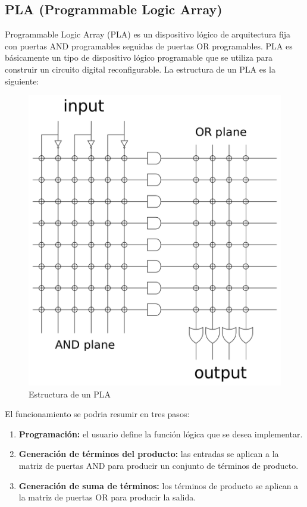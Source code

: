 \subsection{PLA (Programmable Logic Array)}
Programmable Logic Array (PLA) es un dispositivo lógico de arquitectura fija con puertas AND programables seguidas de puertas OR programables. PLA es básicamente un tipo de dispositivo lógico programable que se utiliza para construir un circuito digital reconfigurable. La estructura de un PLA es la siguiente:

\begin{figure}[h]
    \centering
    \includegraphics[scale=0.2]{img/pla.png}
    \caption{Estructura de un PLA}
\end{figure}

El funcionamiento se podria resumir en tres pasos:

\begin{enumerate}
    \item \textbf{Programación:} el usuario define la función lógica que se desea implementar.
    \item \textbf{Generación de términos del producto:} las entradas se aplican a la matriz de puertas AND para producir un conjunto de términos de producto.
    \item \textbf{Generación de suma de términos:} los términos de producto se aplican a la matriz de puertas OR para producir la salida.
\end{enumerate}

